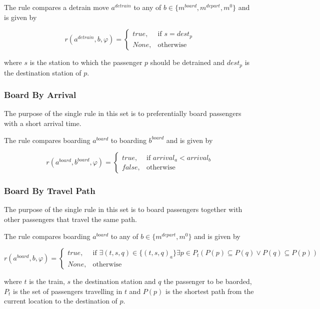 \documentclass[a4paper,12pt,parskip]{article}
\begin{document}
The rule compares a detrain move $a^{detrain}$ to any of 
$b \in \{m^{board}, m^{depart}, m^0\}$ and is given by

\[
    r(a^{detrain}, b, \varphi) = 
    \begin{cases}
        true,& \text{if } s = dest_p\\
        None,& \text{otherwise}
    \end{cases}
\]

where $s$ is the station to which the passenger $p$ should be detrained and 
$dest_p$ is the destination station of $p$.


\subsubsection{Board By Arrival}
\label{rule:3}

The purpose of the single rule in this set is to preferentially board passengers 
with a short arrival time. 

The rule compares boarding $a^{board}$ to boarding $b^{board}$ and 
is given by

\[
    r(a^{board}, b^{board}, \varphi) = 
    \begin{cases}
        true,& \text{if } arrival_a < arrival_b\\
        false,& \text{otherwise}
    \end{cases}
\]

\subsubsection{Board By Travel Path}
\label{rule:4}

The purpose of the single rule in this set is to board passengers together with 
other passengers that travel the same path.

The rule compares boarding $a^{board}$ to any of $b \in \{m^{depart}, m^0\}$ and 
is given by

\[
    r(a^{board}, b, \varphi) = 
    \begin{cases}
        true,& \text{if } \exists (t,s,q) \in \{(t,s,q)_a\} \exists p \in P_t (P(p) \subseteq P(q) \lor P(q) \subseteq P(p))\\
        None,& \text{otherwise}
    \end{cases}
\]

where $t$ is the train, $s$ the destination station and $q$ the passenger to be 
baorded, $P_t$ is the set of passengers travelling in $t$ and $P(p)$ is 
the shortest path from the current location to the destination of $p$.
\end{document}
